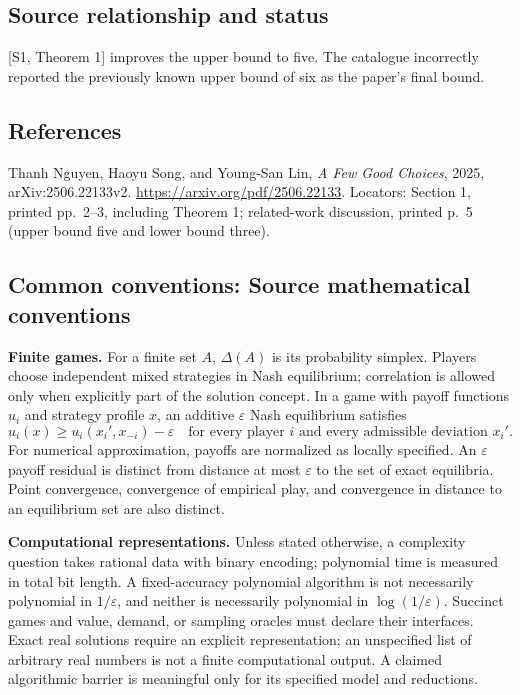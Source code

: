 \documentclass[11pt,a4paper]{article}
\begin{document}
\subsection*{Source relationship and status}
[S1, Theorem 1] improves the upper bound to five.
The catalogue incorrectly reported the previously known upper bound
of six as the paper's final bound.

\subsection*{References}
\begingroup\footnotesize\raggedright
\noindent[S1] Thanh Nguyen, Haoyu Song, and Young-San Lin,
\emph{A Few Good Choices}, 2025, arXiv:2506.22133v2.
\url{https://arxiv.org/pdf/2506.22133}.
Locators: Section 1, printed pp.~2--3, including Theorem 1;
related-work discussion, printed p.~5 (upper bound five and lower
bound three).
\par\endgroup

\subsection*{Common conventions: Source mathematical conventions}

\textbf{Finite games.} For a finite set $A$, $\Delta(A)$ is its probability
simplex. Players choose independent mixed strategies in Nash equilibrium;
correlation is allowed only when explicitly part of the solution concept.
In a game with payoff functions $u_i$ and strategy profile $x$, an additive
$\varepsilon$ Nash equilibrium satisfies
\[
 u_i(x)\geq u_i(x_i',x_{-i})-\varepsilon
 \quad\text{for every player $i$ and every admissible deviation $x_i'$}.
\]
For numerical approximation, payoffs are normalized as locally specified.
An $\varepsilon$ payoff residual is distinct from distance at most
$\varepsilon$ to the set of exact equilibria. Point convergence, convergence
of empirical play, and convergence in distance to an equilibrium set are
also distinct.

\textbf{Computational representations.} Unless stated otherwise, a complexity
question takes rational data with binary encoding; polynomial time is measured
in total bit length. A fixed-accuracy polynomial algorithm is not necessarily
polynomial in $1/\varepsilon$, and neither is necessarily polynomial in
$\log(1/\varepsilon)$. Succinct games and value, demand, or sampling oracles
must declare their interfaces. Exact real solutions require an explicit
representation; an unspecified list of arbitrary real numbers is not a
finite computational output. A claimed algorithmic barrier is meaningful
only for its specified model and reductions.
\end{document}
